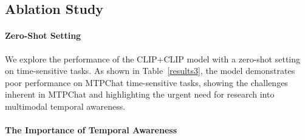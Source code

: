 \subsection{Ablation Study}

\paragraph{Zero-Shot Setting}

\begin{table}[h]

\centering
{}
 \vspace{-2mm} 
\caption{\label{results3}
Ablation study of baseline CLIP+CLIP with zero-shot setting.
}
\vspace{-2mm} 
\end{table}

We explore the performance of the CLIP+CLIP model with a zero-shot setting on time-sensitive tasks. As shown in Table~\ref{results3}, the model demonstrates poor performance on MTPChat time-sensitive tasks, showing the challenges inherent in MTPChat and highlighting the urgent need for research into multimodal temporal awareness.

\paragraph{The Importance of Temporal Awareness}

